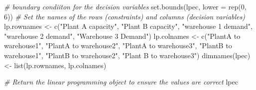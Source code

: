 \documentclass[
]{article}
\newenvironment{Shaded}{\begin{snugshade}}{\end{snugshade}}
\newcommand{\AttributeTok}[1]{\textcolor[rgb]{0.77,0.63,0.00}{#1}}
\newcommand{\CommentTok}[1]{\textcolor[rgb]{0.56,0.35,0.01}{\textit{#1}}}
\newcommand{\DecValTok}[1]{\textcolor[rgb]{0.00,0.00,0.81}{#1}}
\newcommand{\FunctionTok}[1]{\textcolor[rgb]{0.00,0.00,0.00}{#1}}
\newcommand{\NormalTok}[1]{#1}
\newcommand{\OtherTok}[1]{\textcolor[rgb]{0.56,0.35,0.01}{#1}}
\newcommand{\StringTok}[1]{\textcolor[rgb]{0.31,0.60,0.02}{#1}}
\begin{document}
\begin{Shaded}
\begin{Highlighting}[]
\CommentTok{\# boundary condiiton for the decision variables}
\FunctionTok{set.bounds}\NormalTok{(lpec, }\AttributeTok{lower =} \FunctionTok{rep}\NormalTok{(}\DecValTok{0}\NormalTok{, }\DecValTok{6}\NormalTok{))}
\CommentTok{\# Set the names of the rows (constraints) and columns (decision variables)}
\NormalTok{lp.rownames }\OtherTok{\textless{}{-}} \FunctionTok{c}\NormalTok{(}\StringTok{"Plant A capacity"}\NormalTok{, }\StringTok{"Plant B capacity"}\NormalTok{, }\StringTok{"warehouse 1 demand"}\NormalTok{, }\StringTok{"warehouse 2 demand"}\NormalTok{, }\StringTok{"Warehouse 3 Demand"}\NormalTok{)}
\NormalTok{lp.colnames }\OtherTok{\textless{}{-}} \FunctionTok{c}\NormalTok{(}\StringTok{"PlantA to warehouse1"}\NormalTok{, }\StringTok{"PlantA to warehouse2"}\NormalTok{, }\StringTok{"PlantA to warehouse3"}\NormalTok{, }\StringTok{"PlantB to warehouse1"}\NormalTok{, }\StringTok{"PlantB to warehouse2"}\NormalTok{, }\StringTok{"Plant B to warehouse3"}\NormalTok{)}
\FunctionTok{dimnames}\NormalTok{(lpec) }\OtherTok{\textless{}{-}} \FunctionTok{list}\NormalTok{(lp.rownames, lp.colnames)}
\end{Highlighting}
\end{Shaded}

\begin{Shaded}
\begin{Highlighting}[]
\CommentTok{\# Return the linear programming object to ensure the values are correct}
\NormalTok{lpec}
\end{Highlighting}
\end{Shaded}
\end{document}
